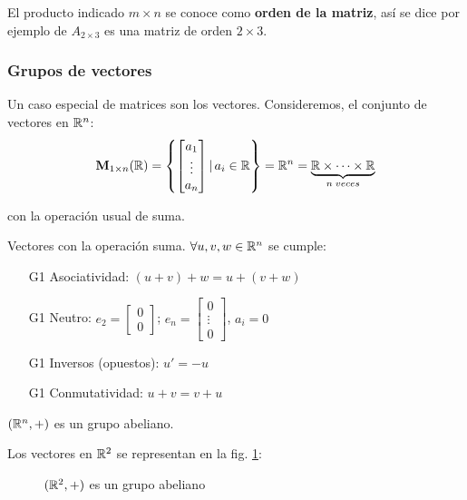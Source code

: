 El producto indicado $m \times n$ se conoce como \textbf{orden de la matriz}, así se dice por ejemplo de $A_{2 \times 3}$ es una matriz de orden $2 \times 3$.

\subsubsection{Grupos de vectores}
Un caso especial de matrices son los vectores. Consideremos, el conjunto de vectores en $\mathbb{R}^n$:
\begin{equation}
	\mathbf{M}_{1 \times n}(\mathbb{R}) = \left\{ \begin{bmatrix}
		a_1 \\ \vdots \\ a_n \end{bmatrix} | \, a_{i} \in \mathbb{R} \right\}
	\label{eq:vectores} = \mathbb{R}^n = \underbrace{\mathbb{R} \times \cdots \times \mathbb{R}}_{n \; veces}
\end{equation}

con la operación usual de suma.

Vectores con la operación suma. $\forall u, v, w \in \mathbb{R}^n$ se cumple:
\begin{itemize}
	\item[G1] Asociatividad: $(u + v) + w = u + (v + w)$ \quad \cmark 
	\item[G1] Neutro: $e_2 = \begin{bmatrix} 0 \\ 0 \end{bmatrix}$; $e_n = \begin{bmatrix} 0 \\ \vdots \\ 0 \end{bmatrix}$, $a_i = 0$ \quad \cmark 
	\item[G1] Inversos (opuestos): $u' = -u$ \quad \cmark 
	\item[G1] Conmutatividad: $u + v = v + u$ \quad \cmark 
\end{itemize}

\begin{center}
	$(\mathbb{R}^n, +)$ es un grupo abeliano.
\end{center}

Los vectores en $\mathbb{R}^2$ se representan en la fig. \ref{fig:grupoR2}:

\begin{figure}[h]
	\centering
	
	\caption{$(\mathbb{R}^2, +)$ es un grupo abeliano}
	\label{fig:grupoR2}
\end{figure}

